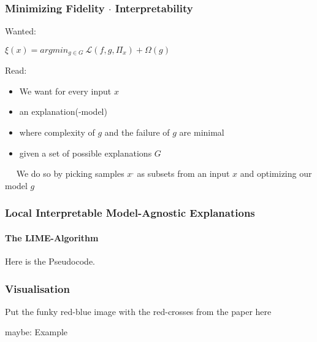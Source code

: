 \begin{frame}
	\frametitle{Minimizing Fidelity $\cdot$ Interpretability}
	\begin{Large}
		Wanted: ~\newline
		\begin{center}
			$\xi(x) = argmin_{g\in G} ~ \mathcal{L}(f,g,\Pi_x) + \Omega(g)$
		\end{center}
		Read: 
		\begin{itemize}
			\item We want for every input $x$
			\item an explanation(-model)
			\item where complexity of $g$ and the failure of $g$ are minimal
			\item given a set of possible explanations $G$
		\end{itemize}
	\end{Large}
~\newline ~\newline 
We do so by picking samples $x^,$ as subsets from an input $x$ and optimizing our model $g$ 
\end{frame}

\begin{frame}
	\frametitle{Local Interpretable Model-Agnostic Explanations}
	\framesubtitle{The LIME-Algorithm}
	Here is the Pseudocode. 
\end{frame}
\begin{frame}
	\frametitle{Visualisation}
	Put the funky red-blue image with the red-crosses from the paper here
\end{frame}

\begin{frame}
	maybe: Example 
\end{frame}